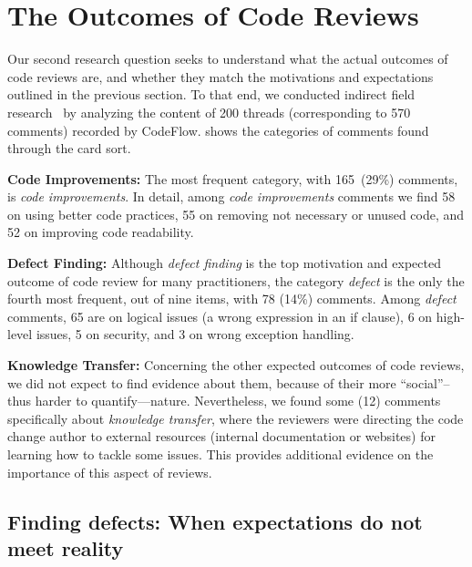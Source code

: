 
\section{The Outcomes of Code Reviews} \label{sec:outcomes}


Our second research question seeks to understand what the actual outcomes of code reviews are, and whether they match the motivations and expectations outlined in the previous section. To that end, we conducted indirect field research~\cite{lethbridge2005studying} by analyzing the content of 200 threads (corresponding to 570 comments) recorded by CodeFlow.  shows the categories of comments found through the card sort.

\textbf{Code Improvements:} The most frequent category, with 165~(29\%) comments, is \emph{code improvements}. In detail, among \emph{code improvements} comments we find 58 on using better code practices, 55 on removing not necessary or unused code, and 52 on improving code readability.

\textbf{Defect Finding:} Although \emph{defect finding} is the top motivation and expected outcome of code review for many practitioners, the category \emph{defect} is the only the fourth most frequent, out of nine items, with 78 (14\%) comments. Among \emph{defect} comments, 65 are on logical issues (\eg a wrong expression in an if clause), 6 on high-level issues, 5 on security, and 3 on wrong exception handling.

\textbf{Knowledge Transfer:} Concerning the other expected outcomes of code reviews, we did not expect to find evidence about them, because of their more ``social''--thus harder to quantify—nature. Nevertheless, we found some (12) comments specifically about \emph{knowledge transfer}, where the reviewers were directing the code change author to external resources (\eg internal documentation or websites) for learning how to tackle some issues. This provides additional evidence on the importance of this aspect of reviews.

\subsection{Finding defects: When expectations do not meet reality}

